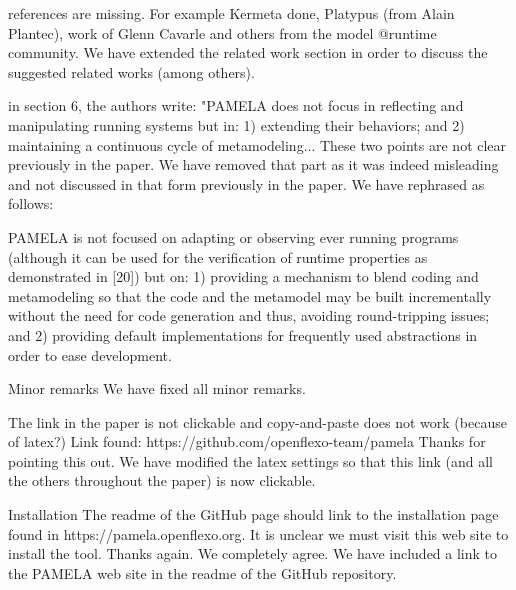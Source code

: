 \documentclass[10pt]{article}
\begin{document}
\begin{response}{references are missing. For example Kermeta done, Platypus (from Alain Plantec), work of Glenn Cavarle and others from the model @runtime community.}
We have extended the related work section in order to discuss the suggested related works (among others).
\end{response}


\begin{response}{in section 6, the authors write: "PAMELA does not focus in reflecting and manipulating running systems but in: 1) extending their behaviors; and 2) maintaining a continuous cycle of metamodeling... These two points are not clear previously in the paper.
}
We have removed that part as it was indeed misleading and not discussed in that form previously in the paper. We have rephrased as follows:

PAMELA is not focused on adapting or observing ever running programs (although it can be used for the verification of runtime properties as demonstrated in [20]) but on:  1) providing a mechanism to blend coding and metamodeling so that the code and the metamodel  may  be  built  incrementally  without  the  need  for  code  generation and thus,  avoiding round-tripping issues;  and 2) providing default implementations for frequently used abstractions in order to ease development.
\end{response}

\begin{response}{Minor remarks}
We have fixed all minor remarks.
\end{response}



\begin{response}{The link in the paper is not clickable and copy-and-paste does not work (because of latex?) Link found: https://github.com/openflexo-team/pamela}
Thanks for pointing this out. We have modified the latex settings so that this link (and all the others throughout the paper) is now clickable.
\end{response}

\begin{response}{Installation
The readme of the GitHub page should link to the installation page found in https://pamela.openflexo.org. It is unclear we must visit this web site to install the tool.
}
Thanks again. We completely agree. We have included a link to the PAMELA web site in the readme of the GitHub repository.
\end{response}
\end{document}
